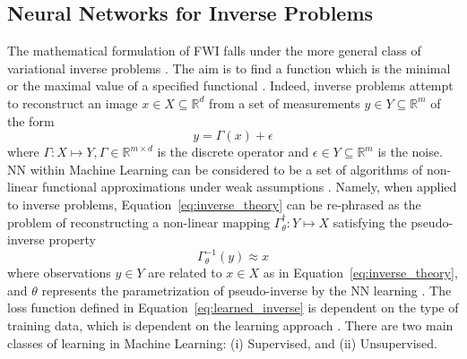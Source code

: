 \subsection{Neural Networks for Inverse Problems}
The mathematical formulation of FWI falls under the more general class of variational inverse problems \citep{Tanaka2003}. The aim is to find a function which is the minimal or the maximal value of a specified functional \citep{Dadvand2006}. Indeed, inverse problems attempt to reconstruct an image $x \in X \subseteq \mathbb{R}^d$ from a set of measurements $y \in Y \subseteq \mathbb{R}^m$ of the form
\begin{equation}\label{eq:inverse_theory}
	y=\Gamma(x)+\epsilon
\end{equation}
where $\Gamma: X \mapsto Y, \Gamma \in \mathbb{R}^{m\times d}$ is the discrete operator and $\epsilon \in Y \subseteq \mathbb{R}^{m}$ is the noise. \ac{NN} within Machine Learning can be considered to be a set of algorithms of non-linear functional approximations under weak assumptions \citep{Oktem2018}. Namely, when applied to inverse problems, Equation~\ref{eq:inverse_theory} can be re-phrased as the problem of reconstructing a non-linear mapping $\Gamma_\theta^{\dagger}:Y \mapsto X$ satisfying the pseudo-inverse property
\begin{equation}\label{eq:learned_inverse}
	\Gamma_\theta^{-1}(y) \approx x
\end{equation}
where observations $y\in Y$ are related to $x\in X$ as in Equation~\ref{eq:inverse_theory}, and $\theta$ represents the parametrization of pseudo-inverse by the \ac{NN} learning \citep{Adler2017a}. The loss function defined in Equation~\ref{eq:learned_inverse} is dependent on the type of training data, which is dependent on the learning approach \citep{Adler2017b}.  There are two main classes of learning in Machine Learning: (i) Supervised, and (ii) Unsupervised.

